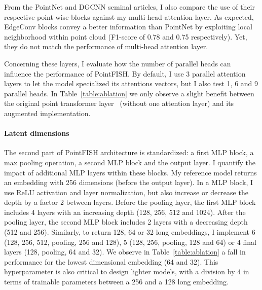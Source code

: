 From the PointNet and DGCNN seminal articles, I also compare the use of their respective point-wise blocks against my multi-head attention layer.
As expected, EdgeConv blocks convey a better information than PointNet by exploiting local neighborhood within point cloud (F1-score of 0.78 and 0.75 respectively).
Yet, they do not match the performance of multi-head attention layer.

Concerning these layers, I evaluate how the number of parallel heads can influence the performance of PointFISH.
By default, I use 3 parallel attention layers to let the model specialized its attentions vectors, but I also test 1, 6 and 9 parallel heads.
In Table~\ref{table:ablation} we only observe a slight benefit between the original point transformer layer~\cite{Zhao_2021_ICCV} (without one attention layer) and its augmented implementation.


\paragraph{Latent dimensions}

The second part of PointFISH architecture is standardized: a first MLP block, a max pooling operation, a second MLP block and the output layer.
I quantify the impact of additional MLP layers within these blocks.
My reference model returns an embedding with 256 dimensions (before the output layer).
In a MLP block, I use ReLU activation and layer normalization, but also increase or decrease the depth by a factor 2 between layers.
Before the pooling layer, the first MLP block includes 4 layers with an increasing depth (128, 256, 512 and 1024).
After the pooling layer, the second MLP block includes 2 layers with a decreasing depth (512 and 256).
Similarly, to return 128, 64 or 32 long embeddings, I implement 6 (128, 256, 512, pooling, 256 and 128), 5 (128, 256, pooling, 128 and 64) or 4 final layers (128, pooling, 64 and 32).
We observe in Table~\ref{table:ablation} a fall in performance for the lowest dimensional embedding (64 and 32).
This hyperparameter is also critical to design lighter models, with a division by 4 in terms of trainable parameters between a 256 and a 128 long embedding.

